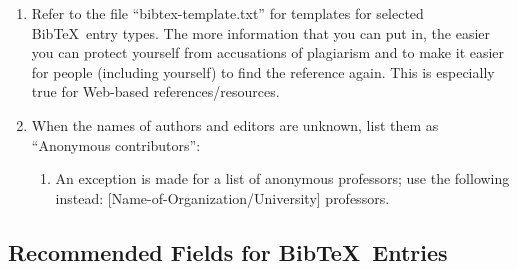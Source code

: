 \documentclass[letter,12pt]{article}
\begin{document}
\begin{enumerate}
\begin{enumerate}
	\item When {\sc Bib}\TeX\ entries are created for the aforementioned sources of information, populate the appropriate fields so that each information in the aforementioned sources are included in the {\sc Bib}\TeX\ entries.
	\item {\it \bf For other organizations, communities, and groups, use the term ``contributors'' instead of ``members'' to indicate that only a subset of them contributed to a publication, unless otherwise specified.} Else, use ``members''.
	\end{enumerate}
\item Refer to the file ``bibtex-template.txt'' for templates for selected {\sc Bib}\TeX\ entry types. The more information that you can put in, the easier you can protect yourself from accusations of plagiarism and to make it easier for people (including yourself) to find the reference again. This is especially true for Web-based references/resources.
\item When the names of authors and editors are unknown, list them as ``Anonymous contributors'': \vspace{-0.3cm}
	\begin{enumerate} \itemsep -2pt
	\item An exception is made for a list of anonymous professors; use the following instead: [Name-of-Organization/University] professors.
	\end{enumerate}
\end{enumerate}



\subsection{Recommended Fields for {\sc Bib}\TeX\ Entries}
\label{ssec:RecommendedFieldsforBibTeXEntries}
\end{document}
